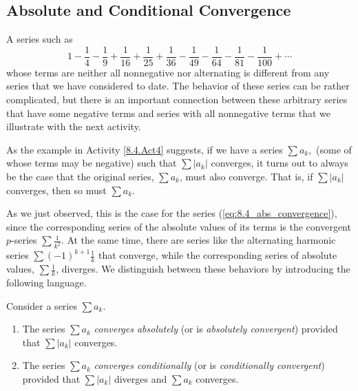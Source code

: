 


\subsection*{Absolute and Conditional Convergence}    

A  series such as
\begin{equation} \label{eq:8.4_abs_convergence}
1 - \frac{1}{4} - \frac{1}{9} + \frac{1}{16} + \frac{1}{25} + \frac{1}{36} - \frac{1}{49}  - \frac{1}{64}  - \frac{1}{81}  - \frac{1}{100}  + \cdots
\end{equation}
whose terms are neither all nonnegative nor alternating is different from any series that we have considered to date. The behavior of these series can be rather complicated, but there is an important connection between these arbitrary series that have some negative terms and series with all nonnegative terms that we illustrate with the next activity.



As the example in Activity \ref{8.4.Act4} suggests, if we have a series $ \sum a_k,$
(some of whose terms may be negative) such that 
$ \sum |a_k|$
converges, it turns out to always be the case that the original series, $ \sum a_k$, must also converge.  That is, 
if $ \sum | a_k |$ converges, then so must $ \sum a_k.$

As we just observed, this is the case for the series (\ref{eq:8.4_abs_convergence}), since the corresponding series of the absolute values of its terms is the convergent $p$-series $ \sum \frac{1}{k^2}$. At the same time, there are series like the alternating harmonic series $ \sum (-1)^{k+1} \frac{1}{k}$ that converge, while the corresponding series of absolute values, $ \sum \frac{1}{k}$, diverges. We distinguish between these behaviors by introducing the following language.

\begin{definition} Consider a series $\sum a_k$.
\begin{enumerate}
\item The series $\sum a_k$ \emph{converges absolutely} (or is \emph{absolutely convergent}) provided that $\sum | a_k |$ converges.
\item The series $\sum a_k$ \emph{converges conditionally} (or is \emph{conditionally convergent}) provided that $\sum | a_k |$ diverges and $\sum a_k$ converges.
\end{enumerate}
\end{definition}


